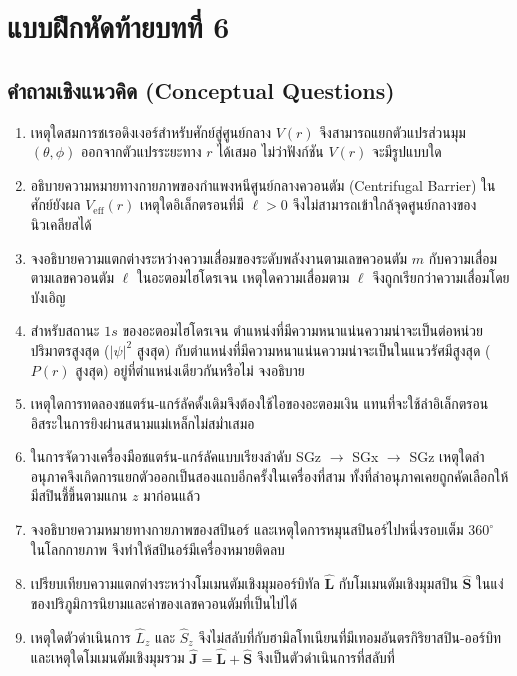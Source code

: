 \section*{แบบฝึกหัดท้ายบทที่ 6}

\subsection*{คำถามเชิงแนวคิด (Conceptual Questions)}

\begin{enumerate}[label=\textbf{\arabic*.}]
    \item เหตุใดสมการชเรอดิงเงอร์สำหรับศักย์สู่ศูนย์กลาง $V(r)$ จึงสามารถแยกตัวแปรส่วนมุม $(\theta, \phi)$ ออกจากตัวแปรระยะทาง $r$ ได้เสมอ ไม่ว่าฟังก์ชัน $V(r)$ จะมีรูปแบบใด
    \item อธิบายความหมายทางกายภาพของกำแพงหนีศูนย์กลางควอนตัม (Centrifugal Barrier) ในศักย์ยังผล $V_{\text{eff}}(r)$ เหตุใดอิเล็กตรอนที่มี $\ell > 0$ จึงไม่สามารถเข้าใกล้จุดศูนย์กลางของนิวเคลียสได้
    \item จงอธิบายความแตกต่างระหว่างความเสื่อมของระดับพลังงานตามเลขควอนตัม $m$ กับความเสื่อมตามเลขควอนตัม $\ell$ ในอะตอมไฮโดรเจน เหตุใดความเสื่อมตาม $\ell$ จึงถูกเรียกว่าความเสื่อมโดยบังเอิญ
    \item สำหรับสถานะ $1s$ ของอะตอมไฮโดรเจน ตำแหน่งที่มีความหนาแน่นความน่าจะเป็นต่อหน่วยปริมาตรสูงสุด ($|\psi|^2$ สูงสุด) กับตำแหน่งที่มีความหนาแน่นความน่าจะเป็นในแนวรัศมีสูงสุด ($P(r)$ สูงสุด) อยู่ที่ตำแหน่งเดียวกันหรือไม่ จงอธิบาย
    \item เหตุใดการทดลองชแตร์น-แกร์ลัคดั้งเดิมจึงต้องใช้ไอของอะตอมเงิน แทนที่จะใช้ลำอิเล็กตรอนอิสระในการยิงผ่านสนามแม่เหล็กไม่สม่ำเสมอ
    \item ในการจัดวางเครื่องมือชแตร์น-แกร์ลัคแบบเรียงลำดับ SGz $\to$ SGx $\to$ SGz เหตุใดลำอนุภาคจึงเกิดการแยกตัวออกเป็นสองแถบอีกครั้งในเครื่องที่สาม ทั้งที่ลำอนุภาคเคยถูกคัดเลือกให้มีสปินชี้ขึ้นตามแกน $z$ มาก่อนแล้ว
    \item จงอธิบายความหมายทางกายภาพของสปินอร์ และเหตุใดการหมุนสปินอร์ไปหนึ่งรอบเต็ม $360^\circ$ ในโลกกายภาพ จึงทำให้สปินอร์มีเครื่องหมายติดลบ
    \item เปรียบเทียบความแตกต่างระหว่างโมเมนตัมเชิงมุมออร์บิทัล $\hat{\mathbf{L}}$ กับโมเมนตัมเชิงมุมสปิน $\hat{\mathbf{S}}$ ในแง่ของปริภูมิการนิยามและค่าของเลขควอนตัมที่เป็นไปได้
    \item เหตุใดตัวดำเนินการ $\hat{L}_z$ และ $\hat{S}_z$ จึงไม่สลับที่กับฮามิลโทเนียนที่มีเทอมอันตรกิริยาสปิน-ออร์บิท และเหตุใดโมเมนตัมเชิงมุมรวม $\hat{\mathbf{J}} = \hat{\mathbf{L}} + \hat{\mathbf{S}}$ จึงเป็นตัวดำเนินการที่สลับที่

\end{enumerate}
